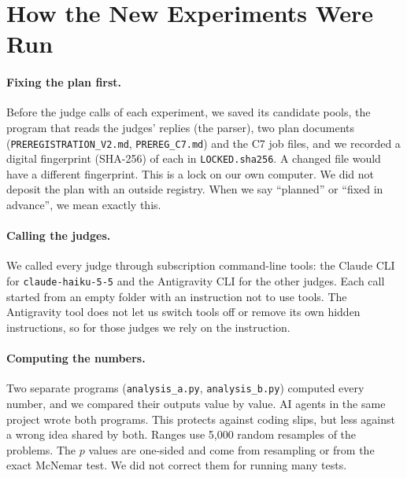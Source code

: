 \documentclass[10pt,twocolumn]{article}
\begin{document}
\section{How the New Experiments Were Run}
\label{sec:design}
\paragraph{Fixing the plan first.} Before the judge calls of each experiment, we saved its candidate pools, the program that reads the judges' replies (the parser), two plan documents (\texttt{PREREGISTRATION\_V2.md}, \texttt{PREREG\_C7.md}) and the C7 job files, and we recorded a digital fingerprint (SHA-256) of each in \texttt{LOCKED.sha256}. A changed file would have a different fingerprint. This is a lock on our own computer. We did not deposit the plan with an outside registry. When we say ``planned'' or ``fixed in advance'', we mean exactly this.

\paragraph{Calling the judges.} We called every judge through subscription command-line tools: the Claude CLI for \texttt{claude-haiku-5-5} and the Antigravity CLI for the other judges. Each call started from an empty folder with an instruction not to use tools. The Antigravity tool does not let us switch tools off or remove its own hidden instructions, so for those judges we rely on the instruction.

\paragraph{Computing the numbers.} Two separate programs (\texttt{analysis\_a.py}, \texttt{analysis\_b.py}) computed every number, and we compared their outputs value by value. AI agents in the same project wrote both programs. This protects against coding slips, but less against a wrong idea shared by both. Ranges use 5,000 random resamples of the problems. The $p$ values are one-sided and come from resampling or from the exact McNemar test. We did not correct them for running many tests.
\end{document}
